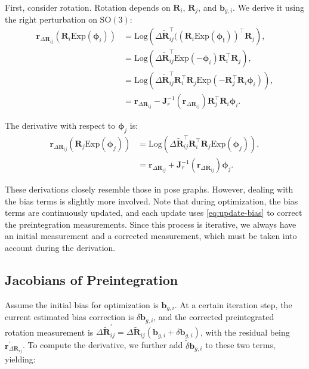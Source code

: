 First, consider rotation. Rotation depends on $\bm{R}_{i}$, $\bm{R}_j$, and $\bm{b}_{g,i}$. We derive it using the right perturbation on $\mathrm{SO}(3)$:  
\begin{equation}\label{key}  
	\begin{aligned}  
		\bm{r}_{\Delta \bm{R}_{ij}}\left(\bm{R}_i \mathrm{Exp} (\boldsymbol{\phi}_i)\right) &=   
		\mathrm{Log} \left( \Delta \tilde{\bm{R}}_{ij}^\top ((\bm{R}_i   
		\mathrm{Exp}(\boldsymbol{\phi_i}))^\top \bm{R}_j \right), \\  
		&= \mathrm{Log} \left( \Delta \tilde{\bm{R}}_{ij}^\top \mathrm{Exp} (-\boldsymbol{\phi}_i )   
		\bm{R}_i^\top \bm{R}_j \right), \\  
		&= \mathrm{Log} \left( \Delta \tilde{\bm{R}}_{ij}^\top \bm{R}_i^\top \bm{R}_j   
		\mathrm{Exp} (-\bm{R}_j^\top \bm{R}_i \boldsymbol{\phi}_i) \right), \\  
		&= \bm{r}_{\Delta \bm{R}_{ij}} - \bm{J}_r^{-1} (\bm{r}_{\Delta \bm{R}_{ij}}) \bm{R}_j^\top   
		\bm{R}_i \boldsymbol{\phi}_i.  
	\end{aligned}  
\end{equation}  

The derivative with respect to $\boldsymbol{\phi}_j$ is:  
\begin{equation}\label{key}  
	\begin{aligned}  
		\bm{r}_{\Delta \bm{R}_{ij}} (\bm{R}_j \mathrm{Exp}(\boldsymbol{\phi}_j)) &=   
		\mathrm{Log}\left(\Delta \tilde{\bm{R}}_{ij}^\top \bm{R}^\top_i \bm{R}_j   
		\mathrm{Exp} (\boldsymbol{\phi}_j ) \right), \\  
		&= \bm{r}_{\Delta \bm{R}_{ij}} + \bm{J}_r^{-1} (\bm{r}_{\Delta \bm{R}_{ij}}) \boldsymbol{\phi}_j.  
	\end{aligned}  
\end{equation}  

These derivations closely resemble those in pose graphs. However, dealing with the bias terms is slightly more involved. Note that during optimization, the bias terms are continuously updated, and each update uses \eqref{eq:update-bias} to correct the preintegration measurements. Since this process is iterative, we always have an initial measurement and a corrected measurement,  which must be taken into account during the derivation.

\subsection{Jacobians of Preintegration}
\label{sec:preinteg-jacobians}
Assume the initial bias for optimization is $\bm{b}_{g,i}$. At a certain iteration step, the current estimated bias correction is $\delta \bm{b}_{g,i}$, and the corrected preintegrated rotation measurement is $\Delta \tilde{\bm{R}}_{ij}^\prime = \Delta \tilde{\bm{R}}_{ij}(\bm{b}_{g,i} + \delta \bm{b}_{g,i})$, with the residual being $\bm{r}_{\Delta \bm{R}_{ij}}^\prime$. To compute the derivative, we further add $\tilde{\delta} \bm{b}_{g,i}$ to these two terms, yielding:

